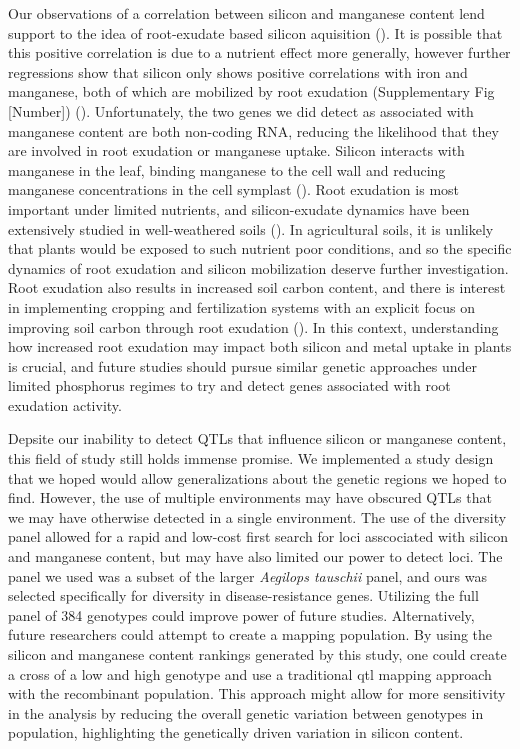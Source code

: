 \documentclass[12pt, letterpaper, ]{report}
\begin{document}
Our observations of a correlation between silicon and manganese content lend support to the idea of root-exudate based silicon aquisition (\cite{de_tombeur_silicon_2021-1}). It is possible that this positive correlation is due to a nutrient effect more generally, however further regressions show that silicon only shows positive correlations with iron and manganese, both of which are mobilized by root exudation (Supplementary Fig [Number]) (\cite{de_tombeur_silicon_2021-1}). Unfortunately, the two genes we did detect as associated with manganese content are both non-coding RNA, reducing the likelihood that they are involved in root exudation or manganese uptake. Silicon interacts with manganese in the leaf, binding manganese to the cell wall and reducing manganese concentrations in the cell symplast (\cite{rogalla_role_2002}). Root exudation is most important under limited nutrients, and silicon-exudate dynamics have been extensively studied in well-weathered soils (\cite{lambers_plant_2008,de_tombeur_shift_2021,de_tombeur_silicon_2021-1}). In agricultural soils, it is unlikely that plants would be exposed to such nutrient poor conditions, and so the specific dynamics of root exudation and silicon mobilization deserve further investigation. Root exudation also results in increased soil carbon content, and there is interest in implementing cropping and fertilization systems with an explicit focus on improving soil carbon through root exudation (\cite{cornelis_soil_2022}). In this context, understanding how increased root exudation may impact both silicon and metal uptake in plants is crucial, and future studies should pursue similar genetic approaches under limited phosphorus regimes to try and detect genes associated with root exudation activity. 

Depsite our inability to detect QTLs that influence silicon or manganese content, this field of study still holds immense promise. We implemented a study design that we hoped would allow generalizations about the genetic regions we hoped to find. However, the use of multiple environments may have obscured QTLs that we may have otherwise detected in a single environment. The use of the diversity panel allowed for a rapid and low-cost first search for loci asscociated with silicon and manganese content, but may have also limited our power to detect loci. The panel we used was a subset of the larger \textit{Aegilops tauschii} panel, and ours was selected specifically for diversity in disease-resistance genes. Utilizing the full panel of 384 genotypes could improve power of future studies. Alternatively, future researchers could attempt to create a mapping population. By using the silicon and manganese content rankings generated by this study, one could create a cross of a low and high genotype and use a traditional qtl mapping approach with the recombinant population. This approach might allow for more sensitivity in the analysis by reducing the overall genetic variation between genotypes in population, highlighting the genetically driven variation in silicon content.
\end{document}
